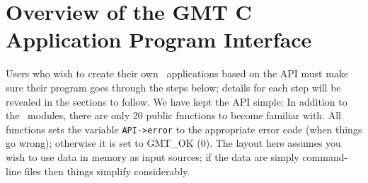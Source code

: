 \documentclass[11pt]{report}
\begin{document}
\chapter{Overview of the GMT C Application Program Interface}

Users who wish to create their own \GMT\ applications based on the API
must make sure their program goes through the steps below; details
for each step will be revealed in the sections to follow.  We have kept the
API simple: In addition to the \GMT\ modules, there are only 20 public functions to become familiar with.
All functions sets the variable \texttt{API->error} to the appropriate error code (when things go wrong);
otherwise it is set to GMT\_OK (0).
The layout here assumes you wish to use data in memory as input sources; if the data are simply
command-line files then things simplify considerably.
\end{document}
